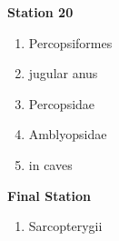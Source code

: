 \textbf{Station 20}

\begin{enumerate}
\def\labelenumi{\arabic{enumi}.}
\setcounter{enumi}{94}
\item
  Percopsiformes
\item
  jugular anus
\item
  Percopsidae
\item
  Amblyopsidae
\item
  in caves
\end{enumerate}

\textbf{Final Station}

\begin{enumerate}
\def\labelenumi{\arabic{enumi}.}
\setcounter{enumi}{99}
\item
  Sarcopterygii
\end{enumerate}
